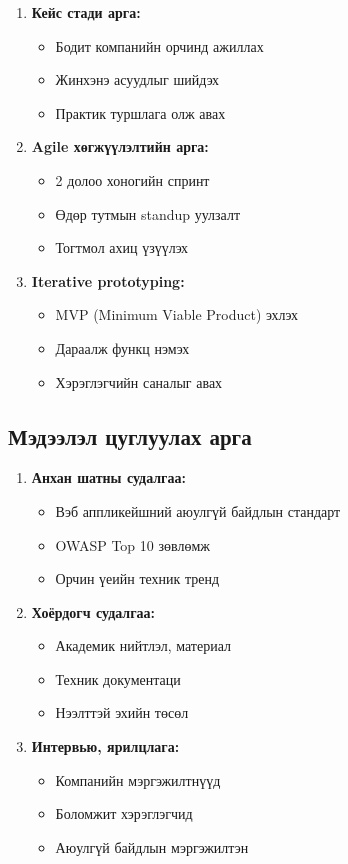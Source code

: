\documentclass[main.tex]{subfiles}
\begin{document}
\begin{enumerate}
    \item \textbf{Кейс стади арга:}
    \begin{itemize}
        \item Бодит компанийн орчинд ажиллах
        \item Жинхэнэ асуудлыг шийдэх
        \item Практик туршлага олж авах
    \end{itemize}
    
    \item \textbf{Agile хөгжүүлэлтийн арга:}
    \begin{itemize}
        \item 2 долоо хоногийн спринт
        \item Өдөр тутмын standup уулзалт
        \item Тогтмол ахиц үзүүлэх
    \end{itemize}
    
    \item \textbf{Iterative prototyping:}
    \begin{itemize}
        \item MVP (Minimum Viable Product) эхлэх
        \item Дараалж функц нэмэх
        \item Хэрэглэгчийн саналыг авах
    \end{itemize}
\end{enumerate}

\subsection{Мэдээлэл цуглуулах арга}

\begin{enumerate}
    \item \textbf{Анхан шатны судалгаа:}
    \begin{itemize}
        \item Вэб аппликейшний аюулгүй байдлын стандарт
        \item OWASP Top 10 зөвлөмж \cite{3}
        \item Орчин үеийн техник тренд
    \end{itemize}
    
    \item \textbf{Хоёрдогч судалгаа:}
    \begin{itemize}
        \item Академик нийтлэл, материал \cite{1}
        \item Техник документаци \cite{9}
        \item Нээлттэй эхийн төсөл
    \end{itemize}
    
    \item \textbf{Интервью, ярилцлага:}
    \begin{itemize}
        \item Компанийн мэргэжилтнүүд
        \item Боломжит хэрэглэгчид
        \item Аюулгүй байдлын мэргэжилтэн
    \end{itemize}
\end{enumerate}
\end{document}
